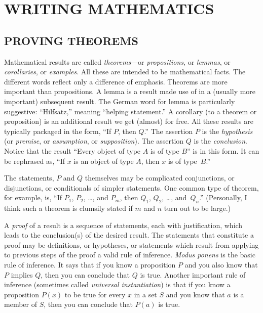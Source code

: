 \chapter{WRITING MATHEMATICS}

\section{PROVING THEOREMS}
Mathematical results are called \emph{theorems}---or \emph{propositions}, or \emph{lemmas}, or
\emph{corollaries}, or \emph{examples}.  All these are intended to be mathematical facts. The
different words reflect only a difference of emphasis. Theorems are more important than
propositions.  A lemma is a result made use of in a (usually more important) subsequent
result.  The German word for lemma is particularly suggestive: ``Hilfsatz,'' meaning ``helping
statement.''  A corollary (to a theorem or proposition) is an additional result we get
(almost) for free.  All these results are typically packaged in the form, ``If $P$, then
$Q$.''  The assertion $P$ is the \emph{hypothesis} (or \emph{premise}, or \emph{assumption},
or \emph{supposition}).  The assertion $Q$ is the \emph{conclusion}. Notice that the result
``Every object of type $A$ is of type $B$'' is in this form.  It can be rephrased as, ``If $x$
is an object of type $A$, then $x$ is of type~$B$.''

The statements, $P$ and $Q$ themselves may be complicated conjunctions, or disjunctions,
or conditionals of simpler statements.  One common type of theorem, for example, is, ``If
$P_1$, $P_2$, \dots, and $P_m$, then $Q_1$, $Q_2$, \dots, and~$Q_n$.''  (Personally, I
think such a theorem is clumsily stated if $m$ and $n$ turn out to be large.)

A
\emph{proof} of a result is a sequence of statements, each with justification, which leads to
the conclusion(s) of the desired result.  The statements that constitute a proof may be
definitions, or hypotheses, or statements which result from applying to previous steps of the
proof a valid
rule of inference.
\emph{Modus ponens} is the basic rule of inference.  It says that if you know a proposition
$P$ and you also know that $P$ implies $Q$, then you can conclude that $Q$ is true.  Another
important rule of inference (sometimes called \emph{universal instantiation}) is that if you
know a proposition $P(x)$ to be true for every $x$ in a set $S$ and you know that $a$ is a
member of $S$, then you can conclude that $P(a)$ is true.


